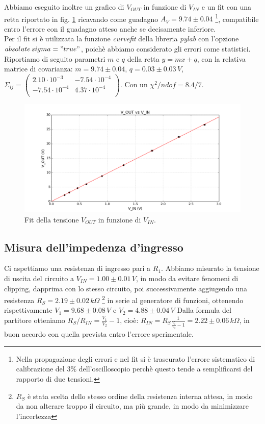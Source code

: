 \documentclass[10pt,a4paper]{article}
\begin{document}
Abbiamo eseguito inoltre un grafico di $V_{OUT}$ in funzione di $V_{IN}$ e un fit con una retta riportato in fig. \ref{rettaGuadagno} ricavando come guadagno $A_V=9.74\pm0.04$ \footnote{Nella propagazione degli errori e nel fit si è trascurato l'errore sistematico di calibrazione del  $3\%$ dell'oscilloscopio perchè questo tende a semplificarsi del rapporto di due tensioni.}, compatibile entro l'errore con il guadagno atteso anche se decisamente inferiore.\\

Per il fit si è utilizzata la funzione \emph{curvefit} della libreria \emph{pylab} con l'opzione \emph{$absolute\,sigma = "true"$}, poichè abbiamo considerato gli errori come statistici. Riportiamo di seguito parametri $m$ e $q$ della retta $y=mx+q$, con la relativa matrice di covarianza: $m = 9.74 \pm 0.04$, $q = 0.03\pm 0.03 \, V$,  $ \Sigma_{ij} = \left( \begin{array}{cc}
2.10 \cdot 10^{-3} & -7.54 \cdot 10^{-4} \\ 
-7.54 \cdot 10^{-4} & 4.37 \cdot 10^{-4}\\
\end{array} \right)$. Con un $\chi^2/ndof = 8.4/7$.\\


\begin{figure}[!htb]
  \centering
  \includegraphics[scale=0.6]{plotGuadagno.png}
\caption{Fit della tensione $V_{OUT}$ in funzione di $V_{IN}$.}
\label{rettaGuadagno}
\end{figure}

\subsection{Misura dell'impedenza d'ingresso}
Ci aspettiamo una resistenza di ingresso pari a $R_1$.
Abbiamo misurato la tensione di uscita del circuito a $V_{IN}=1.00 \pm 0.01 \, V$, in modo da evitare fenomeni di clipping, dapprima con lo stesso circuito, poi successivamente aggiugendo una resistenza $R_S=2.19 \pm 0.02 \, k \Omega$ \footnote{$R_S$ è stata scelta dello stesso ordine della resistenza interna attesa, in modo da non alterare troppo il circuito, ma più grande, in modo da minimizzare l'incertezza} in serie al generatore di funzioni, ottenendo rispettivamente $V_1=9.68 \pm 0.08 \, V$ e $V_2= 4.88 \pm 0.04 \, V$ Dalla formula del partitore otteniamo $R_S/R_{IN}=\frac{V_1}{V_2}-1$, cioè:
$R_{IN} = R_S \frac{1}{\frac{V_1}{V_2}-1} = 2.22 \pm 0.06 \, k \Omega$, in buon accordo con quella prevista entro l'errore sperimentale.
\end{document}
